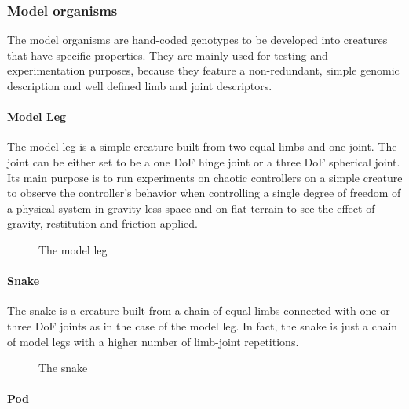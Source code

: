 \documentclass[main]{subfiles}
\begin{document}

\subsubsection{Model organisms}

The model organisms are hand-coded genotypes to be developed into creatures that have specific properties. They are mainly used for testing and experimentation purposes, because they feature a non-redundant, simple genomic description and well defined limb and joint descriptors.

\paragraph{Model Leg}

The model leg is a simple creature built from two equal limbs and one joint. The joint can be either set to be a one DoF hinge joint or a three DoF spherical joint. Its main purpose is to run experiments on chaotic controllers on a simple creature to observe the controller's behavior when controlling a single degree of freedom of a physical system in gravity-less space and on flat-terrain to see the effect of gravity, restitution and friction applied.

\begin{figure}[!h]
\centering
{}
\caption[The model leg]{The model leg}
\label{figure:model-leg}
\end{figure}

\paragraph{Snake}

The snake is a creature built from a chain of equal limbs connected with one or three DoF joints as in the case of the model leg. In fact, the snake is just a chain of model legs with a higher number of limb-joint repetitions.

\begin{figure}[!h]
\centering
{}
\caption[The snake]{The snake}
\label{figure:snake}
\end{figure}


\paragraph{Pod}
\end{document}
